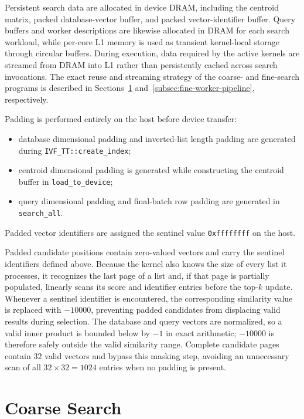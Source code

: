 Persistent search data are allocated in device DRAM, including the centroid matrix, packed database-vector buffer, and packed vector-identifier buffer. Query buffers and worker descriptions are likewise allocated in DRAM for each search workload, while per-core L1 memory is used as transient kernel-local storage through circular buffers. During execution, data required by the active kernels are streamed from DRAM into L1 rather than persistently cached across search invocations. The exact reuse and streaming strategy of the coarse- and fine-search programs is described in Sections~\ref{sec:coarse-search} and~\ref{subsec:fine-worker-pipeline}, respectively.

Padding is performed entirely on the host before device transfer:
\begin{itemize}
    \item database dimensional padding and inverted-list length padding are generated during \texttt{IVF\_TT::create\_index};
    \item centroid dimensional padding is generated while constructing the centroid buffer in \texttt{load\_to\_device};
    \item query dimensional padding and final-batch row padding are generated in \texttt{search\_all}.
\end{itemize}
Padded vector identifiers are assigned the sentinel value \texttt{0xffffffff} on the host.

Padded candidate positions contain zero-valued vectors and carry the sentinel identifiers defined above. Because the kernel also knows the size of every list it processes, it recognizes the last page of a list and, if that page is partially populated, linearly scans its score and identifier entries before the top-\(k\) update. Whenever a sentinel identifier is encountered, the corresponding similarity value is replaced with \(-10000\), preventing padded candidates from displacing valid results during selection. The database and query vectors are normalized, so a valid inner product is bounded below by \(-1\) in exact arithmetic; \(-10000\) is therefore safely outside the valid similarity range. Complete candidate pages contain 32 valid vectors and bypass this masking step, avoiding an unnecessary scan of all \(32\times32=1024\) entries when no padding is present.

\section{Coarse Search}
\label{sec:coarse-search}

